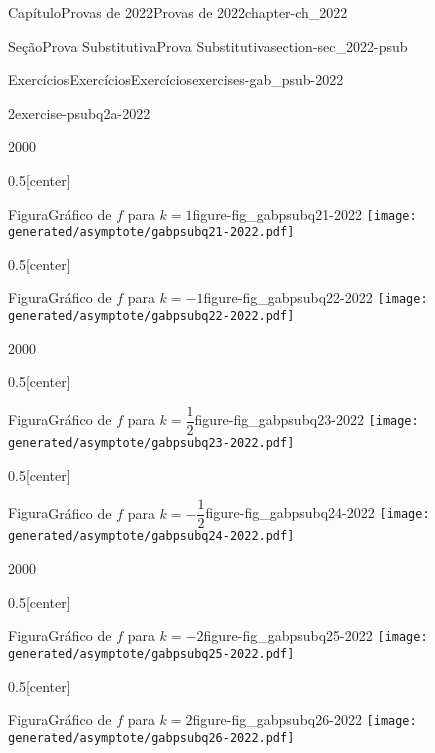 \documentclass[oneside,10pt,]{book}
\numberwithin{equation}{section}
\begin{document}
\begin{chapterptx}{Capítulo}{Provas de 2022}{}{Provas de 2022}{}{}{chapter-ch_2022}
\begin{sectionptx}{Seção}{Prova Substitutiva}{}{Prova Substitutiva}{}{}{section-sec_2022-psub}
\begin{exercises-subsection-numberless}{Exercícios}{Exercícios}{}{Exercícios}{}{}{exercises-gab_psub-2022}
\begin{divisionexercise}{2}{}{}{exercise-psubq2a-2022}
\begin{sidebyside}{2}{0}{0}{0}
\begin{sbspanel}{0.5}[center]
\begin{panelfigureptx}{Figura}{Gráfico de \(f\) para \(k=1\)}{figure-fig_gabpsubq21-2022}{}%
\texttt{[image: generated/asymptote/gabpsubq21-2022.pdf]}
\tcblower
\end{panelfigureptx}%
\end{sbspanel}%
\begin{sbspanel}{0.5}[center]%
\begin{panelfigureptx}{Figura}{Gráfico de \(f\) para \(k=-1\)}{figure-fig_gabpsubq22-2022}{}%
\texttt{[image: generated/asymptote/gabpsubq22-2022.pdf]}
\tcblower
\end{panelfigureptx}%
\end{sbspanel}%
\end{sidebyside}%
\begin{sidebyside}{2}{0}{0}{0}%
\begin{sbspanel}{0.5}[center]%
\begin{panelfigureptx}{Figura}{Gráfico de \(f\) para \(k=\dfrac{1}{2}\)}{figure-fig_gabpsubq23-2022}{}%
\texttt{[image: generated/asymptote/gabpsubq23-2022.pdf]}
\tcblower
\end{panelfigureptx}%
\end{sbspanel}%
\begin{sbspanel}{0.5}[center]%
\begin{panelfigureptx}{Figura}{Gráfico de \(f\) para \(k=-\dfrac{1}{2}\)}{figure-fig_gabpsubq24-2022}{}%
\texttt{[image: generated/asymptote/gabpsubq24-2022.pdf]}
\tcblower
\end{panelfigureptx}%
\end{sbspanel}%
\end{sidebyside}%
\begin{sidebyside}{2}{0}{0}{0}%
\begin{sbspanel}{0.5}[center]%
\begin{panelfigureptx}{Figura}{Gráfico de \(f\) para \(k=-2\)}{figure-fig_gabpsubq25-2022}{}%
\texttt{[image: generated/asymptote/gabpsubq25-2022.pdf]}
\tcblower
\end{panelfigureptx}%
\end{sbspanel}%
\begin{sbspanel}{0.5}[center]%
\begin{panelfigureptx}{Figura}{Gráfico de \(f\) para \(k=2\)}{figure-fig_gabpsubq26-2022}{}%
\texttt{[image: generated/asymptote/gabpsubq26-2022.pdf]}
\tcblower
\end{panelfigureptx}%

\end{sbspanel}
\end{sidebyside}
\end{divisionexercise}
\end{exercises-subsection-numberless}
\end{sectionptx}
\end{chapterptx}
\end{document}
